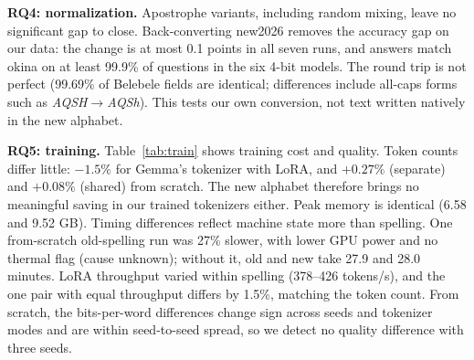 \textbf{RQ4: normalization.} Apostrophe variants, including random mixing, leave no significant gap to close. Back-converting new2026 removes the accuracy gap on our data: the change is at most 0.1 points in all seven runs, and answers match okina on at least 99.9\% of questions in the six 4-bit models. The round trip is not perfect (99.69\% of Belebele fields are identical; differences include all-caps forms such as \emph{AQSH}$\to$\emph{AQSh}). This tests our own conversion, not text written natively in the new alphabet.

\textbf{RQ5: training.} Table~\ref{tab:train} shows training cost and quality. Token counts differ little: $-1.5\%$ for Gemma's tokenizer with LoRA, and $+0.27\%$ (separate) and $+0.08\%$ (shared) from scratch. The new alphabet therefore brings no meaningful saving in our trained tokenizers either. Peak memory is identical (6.58 and 9.52 GB). Timing differences reflect machine state more than spelling. One from-scratch old-spelling run was 27\% slower, with lower GPU power and no thermal flag (cause unknown); without it, old and new take 27.9 and 28.0 minutes. LoRA throughput varied within spelling (378--426 tokens/s), and the one pair with equal throughput differs by 1.5\%, matching the token count. From scratch, the bits-per-word differences change sign across seeds and tokenizer modes and are within seed-to-seed spread, so we detect no quality difference with three seeds.

\begin{table}[t]
\centering\small
\setlength{\tabcolsep}{3pt}
\caption{Training on old vs.\ new spelling: mean $\pm$ SD over three seeds. Bits per word on validation text in the same spelling.}
\label{tab:train}
\end{table}

